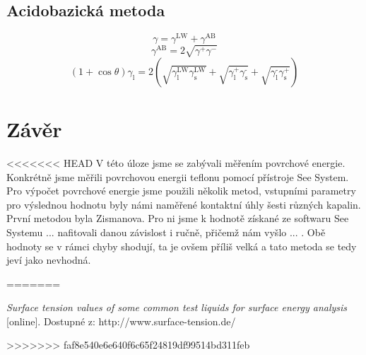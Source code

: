\documentclass{protokol}
\begin{document}
\subsection{Acidobazická metoda}
\begin{equation}
	\gamma = \gamma^{\text{LW}} + \gamma^{\text{AB}}
\end{equation}
\begin{equation}
	\gamma^{\text{AB}} = 2\sqrt{\gamma^+\gamma^-}
\end{equation}
\begin{equation}
		\left(1+\cos\theta\right)\gamma_{\text{l}} = 
		2\left(\sqrt{\gamma_\text{l}^{\text{LW}}\gamma_\text{s}^{\text{LW}}} + 
		\sqrt{\gamma_\text{l}^{\text{+}}\gamma_\text{s}^{\text{-}}} + 
		\sqrt{\gamma_\text{l}^{\text{-}}\gamma_\text{s}^{\text{+}}}\right)
\end{equation}
\par 







\section{Závěr}
<<<<<<< HEAD
V této úloze jsme se zabývali měřením povrchové energie. Konkrétně jsme měřili povrchovou energii teflonu pomocí přístroje See System. Pro výpočet povrchové energie jsme použili několik metod, vstupními parametry pro výslednou hodnotu byly námi naměřené kontaktní úhly šesti různých kapalin. První metodou byla Zismanova. Pro ni jsme k hodnotě získané ze softwaru See Systemu ... nafitovali danou závislost i ručně, přičemž nám vyšlo ... . Obě hodnoty se v rámci chyby shodují, ta je ovšem příliš velká a tato metoda se tedy jeví jako nevhodná.

=======

\begin{thebibliography}{10}
	 {\textit{Surface tension values of some common test 
	liquids 
	for surface energy analysis} [online]. Dostupné z: 
	http://www.surface-tension.de/}
	
\end{thebibliography}
>>>>>>> faf8e540e6e640f6c65f24819df99514bd311feb
\end{document}
